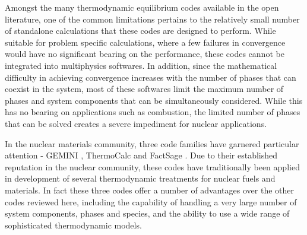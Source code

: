 	Amongst the many thermodynamic equilibrium codes available in the open literature, one of the common limitations pertains to the relatively small number of standalone calculations that these codes are designed to perform. While suitable for problem specific calculations, where a few failures in convergence would have no significant bearing on the performance, these codes cannot be integrated into multiphysics softwares. In addition, since the mathematical difficulty in achieving convergence increases with the number of phases that can coexist in the system, most of these softwares  limit the maximum number of phases and system components that can be simultaneously considered. While this has no bearing on applications such as combustion, the limited number of phases that can be solved creates a severe impediment for nuclear applications.

	In the nuclear materials community, three code families have garnered particular attention - GEMINI \cite{Cheynet09}, ThermoCalc \cite{ANDERSSON2002273} and FactSage \cite{Bale02}. Due to their established reputation in the nuclear community, these codes have traditionally been applied in development of several thermodynamic treatments for nuclear fuels and materials. In fact these three codes offer a number of advantages over the other codes reviewed here, including the capability of handling a very large number of system components, phases and species, and the ability to use a wide range of sophisticated thermodynamic models.
	
